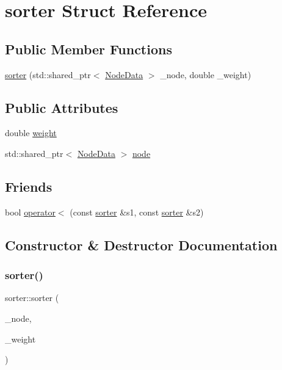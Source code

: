 \hypertarget{structsorter}{}\section{sorter Struct Reference}
\label{structsorter}
\subsection*{Public Member Functions}
\begin{DoxyCompactItemize}
\item 
\mbox{\hyperlink{structsorter_adc96b703089a9755d7087ecb6d475b63}{sorter}} (std\+::shared\+\_\+ptr$<$ \mbox{\hyperlink{class_node_data}{Node\+Data}} $>$ \+\_\+node, double \+\_\+weight)
\end{DoxyCompactItemize}
\subsection*{Public Attributes}
\begin{DoxyCompactItemize}
\item 
double \mbox{\hyperlink{structsorter_a890352ac86d3a78bad36f4fc5b25f6a9}{weight}}
\item 
std\+::shared\+\_\+ptr$<$ \mbox{\hyperlink{class_node_data}{Node\+Data}} $>$ \mbox{\hyperlink{structsorter_abce7bdc12af3769d345b0eb748d18dc8}{node}}
\end{DoxyCompactItemize}
\subsection*{Friends}
\begin{DoxyCompactItemize}
\item 
bool \mbox{\hyperlink{structsorter_a61143b150c32da936d9a5a1a60ce1c08}{operator$<$}} (const \mbox{\hyperlink{structsorter}{sorter}} \&s1, const \mbox{\hyperlink{structsorter}{sorter}} \&s2)
\end{DoxyCompactItemize}


\subsection{Constructor \& Destructor Documentation}
\mbox{\label{structsorter_adc96b703089a9755d7087ecb6d475b63}} 
\subsubsection{\texorpdfstring{sorter()}{sorter()}}
{\footnotesize\ttfamily sorter\+::sorter (\begin{DoxyParamCaption}\item[{std\+::shared\+\_\+ptr$<$ \mbox{\hyperlink{class_node_data}{Node\+Data}} $>$}]{\+\_\+node,  }\item[{double}]{\+\_\+weight }\end{DoxyParamCaption})\hspace{0.3cm}{\ttfamily [inline]}}



